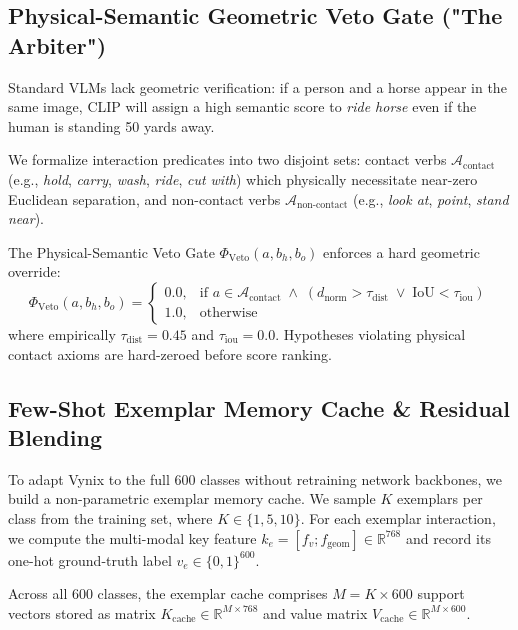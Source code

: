 \documentclass[conference]{IEEEtran}
\begin{document}
\subsection{Physical-Semantic Geometric Veto Gate ("The Arbiter")}
Standard VLMs lack geometric verification: if a person and a horse appear in the same image, CLIP will assign a high semantic score to \textit{ride horse} even if the human is standing 50 yards away. 

We formalize interaction predicates into two disjoint sets: contact verbs $\mathcal{A}_{\text{contact}}$ (e.g., \textit{hold}, \textit{carry}, \textit{wash}, \textit{ride}, \textit{cut with}) which physically necessitate near-zero Euclidean separation, and non-contact verbs $\mathcal{A}_{\text{non-contact}}$ (e.g., \textit{look at}, \textit{point}, \textit{stand near}).

The Physical-Semantic Veto Gate $\Phi_{\text{Veto}}(a, b_h, b_o)$ enforces a hard geometric override:
\begin{equation}
    \Phi_{\text{Veto}}(a, b_h, b_o) = 
    \begin{cases} 
        0.0, & \text{if } a \in \mathcal{A}_{\text{contact}} \;\land\; (d_{\text{norm}} > \tau_{\text{dist}} \;\lor\; \text{IoU} < \tau_{\text{iou}}) \\
        1.0, & \text{otherwise}
    \end{cases}
\end{equation}
where empirically $\tau_{\text{dist}} = 0.45$ and $\tau_{\text{iou}} = 0.0$. Hypotheses violating physical contact axioms are hard-zeroed before score ranking.

\subsection{Few-Shot Exemplar Memory Cache & Residual Blending}
To adapt Vynix to the full 600 classes without retraining network backbones, we build a non-parametric exemplar memory cache. We sample $K$ exemplars per class from the training set, where $K \in \{1, 5, 10\}$. For each exemplar interaction, we compute the multi-modal key feature $k_e = [f_v; f_{\text{geom}}] \in \mathbb{R}^{768}$ and record its one-hot ground-truth label $v_e \in \{0, 1\}^{600}$.

Across all 600 classes, the exemplar cache comprises $M = K \times 600$ support vectors stored as matrix $K_{\text{cache}} \in \mathbb{R}^{M \times 768}$ and value matrix $V_{\text{cache}} \in \mathbb{R}^{M \times 600}$. 
\end{document}

